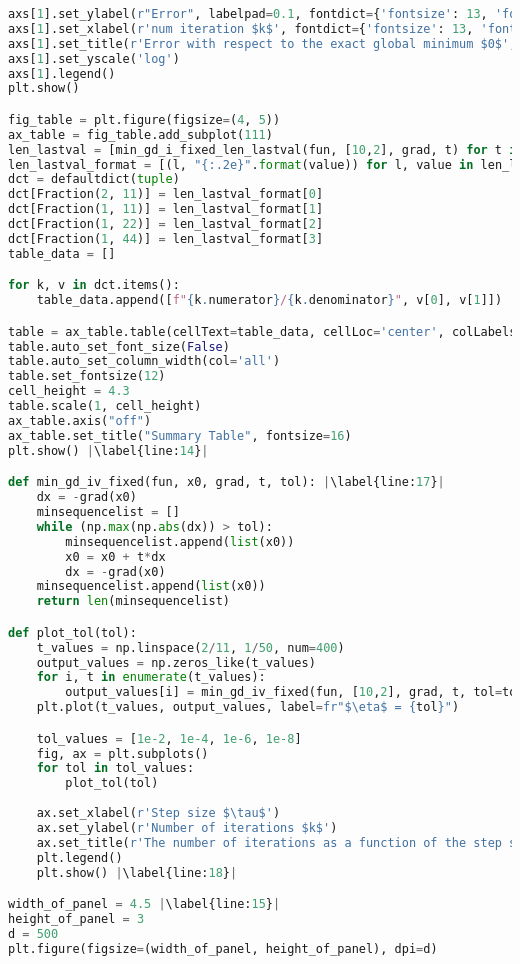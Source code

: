 \begin{lstlisting}[language=Python, label={lst:code6}, mathescape=true, breaklines=true, escapechar=|]
axs[1].set_ylabel(r"Error", labelpad=0.1, fontdict={'fontsize': 13, 'fontweight': 'medium'})
axs[1].set_xlabel(r'num iteration $k$', fontdict={'fontsize': 13, 'fontweight': 'medium'}) 
axs[1].set_title(r'Error with respect to the exact global minimum $0$', fontdict={'fontsize': 12, 'fontweight': 'medium'})
axs[1].set_yscale('log')
axs[1].legend()
plt.show()

fig_table = plt.figure(figsize=(4, 5))
ax_table = fig_table.add_subplot(111)
len_lastval = [min_gd_i_fixed_len_lastval(fun, [10,2], grad, t) for t in [2/11, 1/11, 1/22, 1/44]]
len_lastval_format = [(l, "{:.2e}".format(value)) for l, value in len_lastval]
dct = defaultdict(tuple)
dct[Fraction(2, 11)] = len_lastval_format[0]
dct[Fraction(1, 11)] = len_lastval_format[1]
dct[Fraction(1, 22)] = len_lastval_format[2]
dct[Fraction(1, 44)] = len_lastval_format[3]
table_data = []

for k, v in dct.items():
    table_data.append([f"{k.numerator}/{k.denominator}", v[0], v[1]])

table = ax_table.table(cellText=table_data, cellLoc='center', colLabels=["Step Size", "Iterations", "Last Value"], loc="center")
table.auto_set_font_size(False)
table.auto_set_column_width(col='all')
table.set_fontsize(12)
cell_height = 4.3
table.scale(1, cell_height)
ax_table.axis("off")
ax_table.set_title("Summary Table", fontsize=16)
plt.show() |\label{line:14}|

def min_gd_iv_fixed(fun, x0, grad, t, tol): |\label{line:17}|
    dx = -grad(x0)
    minsequencelist = []
    while (np.max(np.abs(dx)) > tol):
        minsequencelist.append(list(x0))
        x0 = x0 + t*dx
        dx = -grad(x0)  
    minsequencelist.append(list(x0))
    return len(minsequencelist)

def plot_tol(tol):
    t_values = np.linspace(2/11, 1/50, num=400)
    output_values = np.zeros_like(t_values)
    for i, t in enumerate(t_values):
        output_values[i] = min_gd_iv_fixed(fun, [10,2], grad, t, tol=tol)
    plt.plot(t_values, output_values, label=fr"$\eta$ = {tol}")

    tol_values = [1e-2, 1e-4, 1e-6, 1e-8]
    fig, ax = plt.subplots()
    for tol in tol_values:
        plot_tol(tol)
    
    ax.set_xlabel(r'Step size $\tau$')
    ax.set_ylabel(r'Number of iterations $k$')
    ax.set_title(r'The number of iterations as a function of the step size $\tau$ for different tolerances')
    plt.legend()
    plt.show() |\label{line:18}|

width_of_panel = 4.5 |\label{line:15}|
height_of_panel = 3
d = 500
plt.figure(figsize=(width_of_panel, height_of_panel), dpi=d)


\end{lstlisting}
